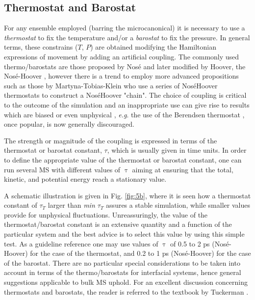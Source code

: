 \documentclass[9pt,tutorial]{livecoms}
\begin{document}
\subsection{Thermostat and Barostat}
\label{sec:thermostat}
For any ensemble employed (barring the microcanonical) it is necessary to use
a \textit{thermostat} to fix the temperature and/or a \textit{barostat} to fix
the pressure. In general terms, these constrains ($T$, $P$) are
obtained modifying the Hamiltonian expressions of movement by adding an
artificial coupling. The commonly used thermo/barostats are those proposed by
Nos\'{e} and later modified by Hoover, the Nos\'{e}-Hoover \citep{hoover1985},
however there is a trend to employ more advanced propositions such as
those by Martyna-Tobias-Klein \citep{martyna1992} who use a series of
Nos\'{e}\textendash{}Hoover thermostats to construct
a Nos\'{e}\textendash{}Hoover "chain".  The choice of coupling is critical to
the outcome of the simulation \citep{shirts2013}
and an inappropriate use can give rise to results which are biased
or even unphysical \citep{wong2016}, \textit{e.g}. the use of
the Berendsen thermostat \citep{berendsen1984},
once popular, is now generally discouraged.

The strength or magnitude of the coupling is expressed in terms of the
thermostat or barostat constant, {${\tau}$}, which is usually given in time
units. In order to define the appropriate value of the thermostat or barostat
constant, one can run several MS with different values of {${\uptau}$} aiming
at ensuring that the total, kinetic, and potential energy reach a stationary
value.

A schematic illustration is given in Fig. \ref{fig:5b}, where it is seen how a thermostat
constant of ${\tau}_{T}$ larger than \textit{min ${\tau}$}$_{T}$ assures
a stable simulation, while smaller values provide for unphysical fluctuations.
Unreassuringly, the value of the thermostat/barostat constant is an extensive quantity and a function of
the particular system and the best advice is to select this value by using this
simple test. As a guideline reference one may use values of {${\uptau}$} of 0.5 to 2 ps
(Nos\'{e}-Hoover) for the case of the thermostat, and 0.2 to 1 ps (Nos\'{e}-Hoover) for the case of the barostat. There are no particular special
considerations to be taken into account in terms of the thermo/barostats for
interfacial systems, hence general suggestions applicable to bulk MS uphold. For an excellent
discussion concerning thermostats and barostats, the reader is referred to the
textbook by Tuckerman \citep{tuckerman2010}.
\end{document}
